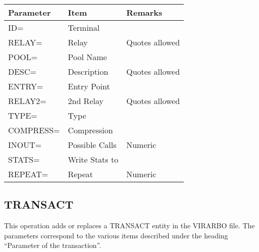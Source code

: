 \documentclass[letterpaper,10pt,english]{sphinxmanual}
\begin{document}
\begin{savenotes}\sphinxattablestart
\centering
\begin{tabulary}{\linewidth}[t]{|T|T|T|}
\hline
\sphinxstyletheadfamily 
Parameter
&\sphinxstyletheadfamily 
Item
&\sphinxstyletheadfamily 
Remarks
\\
\hline
ID=
&
Terminal
&\\
\hline
RELAY=
&
Relay
&
Quotes allowed
\\
\hline
POOL=
&
Pool Name
&\\
\hline
DESC=
&
Description
&
Quotes allowed
\\
\hline
ENTRY=
&
Entry Point
&\\
\hline
RELAY2=
&
2nd Relay
&
Quotes allowed
\\
\hline
TYPE=
&
Type
&\\
\hline
COMPRESS=
&
Compression
&\\
\hline
INOUT=
&
Possible Calls
&
Numeric
\\
\hline
STATS=
&
Write Stats to
&\\
\hline
REPEAT=
&
Repeat
&
Numeric
\\
\hline
\end{tabulary}
\par
\sphinxattableend\end{savenotes}

\ignorespaces 

\subsection{TRANSACT}
\label{\detokenize{Installation_Guide:transact}}\label{\detokenize{Installation_Guide:index-175}}
This operation adds or replaces a TRANSACT entity in the VIRARBO file. The parameters correspond to the various items described under the heading “Parameter of the transaction”.
\end{document}
